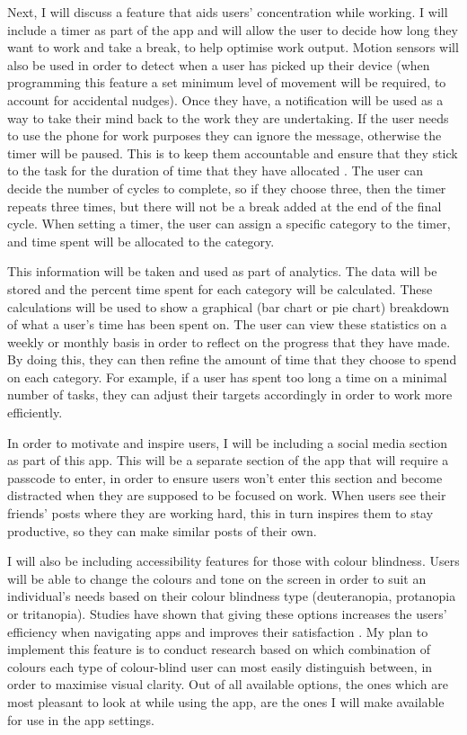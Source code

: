 \documentclass[12pt]{article}
\begin{document}
Next, I will discuss a feature that aids users’ concentration while working. I will include a timer as part of the app and will allow the user to decide how long they want to work and take a break, to help optimise work output. Motion sensors will also be used in order to detect when a user has picked up their device (when programming this feature a set minimum level of movement will be required, to account for accidental nudges). Once they have, a notification will be used as a way to take their mind back to the work they are undertaking. If the user needs to use the phone for work purposes they can ignore the message, otherwise the timer will be paused. This is to keep them accountable and ensure that they stick to the task for the duration of time that they have allocated \cite{two}. The user can decide the number of cycles to complete, so if they choose three, then the timer repeats three times, but there will not be a break added at the end of the final cycle. When setting a timer, the user can assign a specific category to the timer, and time spent will be allocated to the category.  

This information will be taken and used as part of analytics. The data will be stored and the percent time spent for each category will be calculated. These calculations will be used to show a graphical (bar chart or pie chart) breakdown of what a user’s time has been spent on. The user can view these statistics on a weekly or monthly basis in order to reflect on the progress that they have made. By doing this, they can then refine the amount of time that they choose to spend on each category. For example, if a user has spent too long a time on a minimal number of tasks, they can adjust their targets accordingly in order to work more efficiently. 

In order to motivate and inspire users, I will be including a social media section as part of this app. This will be a separate section of the app that will require a passcode to enter, in order to ensure users won’t enter this section and become distracted when they are supposed to be focused on work. When users see their friends' posts where they are working hard, this in turn inspires them to stay productive, so they can make similar posts of their own. 

I will also be including accessibility features for those with colour blindness. Users will be able to change the colours and tone on the screen in order to suit an individual's needs based on their colour blindness type (deuteranopia, protanopia or tritanopia). Studies have shown that giving these options increases the users’ efficiency when navigating apps and improves their satisfaction \cite{three}. My plan to implement this feature is to conduct research based on which combination of colours each type of colour-blind user can most easily distinguish between, in order to maximise visual clarity. Out of all available options, the ones which are most pleasant to look at while using the app, are the ones I will make available for use in the app settings. 
\end{document}
